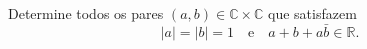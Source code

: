 Determine todos os pares \((a, b) \in \mathbb{C} \times \mathbb{C}\) que satisfazem
\[
|a| = |b| = 1 \quad \text{e} \quad a + b + a\bar{b} \in \mathbb{R}.
\]
